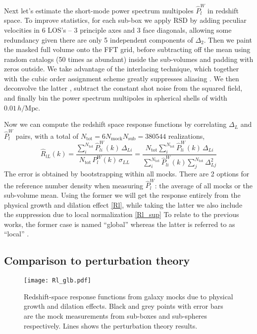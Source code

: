 \documentclass[a4paper,11pt]{article}
\newcommand{\Mpc}{\mathrm{Mpc}}
\newcommand{\hMpc}{{\,h/\Mpc}}
\newcommand{\tot}{\mathrm{tot}}
\newcommand{\mock}{\mathrm{mock}}
\newcommand{\sub}{\mathrm{sub}}
\begin{document}
Next let's estimate the short-mode power spectrum multipoles $\hat P_l^W$ in
redshift space.
To improve statistics, for each sub-box we apply RSD by adding peculiar
velocities in 6 LOS's -- 3 principle axes and 3 face diagonals, allowing some
redundancy given there are only 5 independent components of $\Delta_2$.
Then we paint the masked full volume onto the FFT grid, before subtracting off
the mean using random catalogs (50 times as abundant) inside the sub-volumes
and padding with zeros outside.
We take advantage of the interlacing technique, which together with the cubic
order assignment scheme greatly suppresses aliasing \cite{SefusattiEtAl16}.
We then deconvolve the latter \cite{Jing05}, subtract the constant shot noise
from the squared field, and finally bin the power spectrum multipoles in
spherical shells of width $0.01\hMpc$.

Now we can compute the redshift space response functions by correlating
$\Delta_L$ and $\hat P_l^W$ pairs, with a total of $N_\tot=6N_\mock
N_\sub=380544$ realizations,
\begin{equation}
    \hat R_{lL}(k) = \frac{\sum_i^{N_\tot} \hat P_{li}^W\!(k)\, \Delta_{Li}}
                        {N_\tot\, P_l^W(k)\, \sigma_{LL}}
    = \frac{N_\tot \sum_i^{N_\tot} \hat P_{li}^W\!(k)\, \Delta_{Li}}
                        {\sum_i^{N_\tot} \hat P_{li}^W(k) \sum_j^{N_\tot} \Delta_{Lj}^2}
\end{equation}
The error is obtained by bootstrapping within all mocks.
There are 2 options for the reference number density when measuring $\hat P_l^W$:
the average of all mocks or the sub-volume mean.  Using the former we will get
the response entirely from the physical growth and dilation effect \eqref{Rl},
while taking the latter we also include the suppression due to local
normalization \eqref{Rl_sup}
To relate to the previous works, the former case is named ``global'' whereas
the latter is referred to as ``local'' \cite{LiHuEtAl14}.



\subsection{Comparison to perturbation theory}
\label{sub:mock_results}

\begin{figure}[tbp]
    \centering
    \texttt{[image: Rl\_glb.pdf]}
    \caption{Redshift-space response functions from galaxy mocks due to
    physical growth and dilation effects.  Black and grey points with error
    bars are the mock measurements from sub-boxes and sub-spheres
    respectively.  Lines shows the perturbation theory results.}
    \label{fig:Rl_glb}
\end{figure}
\end{document}
